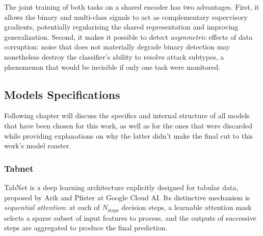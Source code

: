 \documentclass[../main.tex]{subfiles}
\begin{document}
The joint training of both tasks on a shared encoder has two advantages.  First, it allows the binary and multi-class signals to act as complementary supervisory gradients, potentially regularising the shared representation and improving generalization.  Second, it makes it possible to detect \emph{asymmetric} effects of data corruption: noise that does not materially degrade binary detection may nonetheless destroy the classifier's ability to resolve attack subtypes, a phenomenon that would be invisible if only one task were monitored.

\newpage
\subsection{Models Specifications}
\label{Chapter: models specs}

Following chapter will discuss the specifics and internal structure of all models that have been chosen for this work, as well as for the ones that were discarded while providing explanations on why the latter didn't make the final cut to this work's model roaster.

\subsubsection{Tabnet}
\label{Chapter: model tabnet}

TabNet\supercite{arik2021tabnet} is a deep learning architecture explicitly designed for tabular data, proposed by Arik and Pfister at Google Cloud AI.  Its distinctive mechanism is \emph{sequential attention}: at each of $N_{\text{steps}}$ decision steps, a learnable attention mask selects a sparse subset of input features to process, and the outputs of successive steps are aggregated to produce the final prediction.
\end{document}
